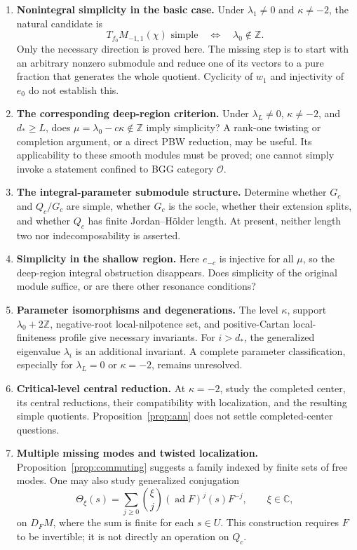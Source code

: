 \documentclass[11pt,a4paper]{article}
\newcommand{\C}{\mathbb C}
\newcommand{\Z}{\mathbb Z}
\newcommand{\ad}{\operatorname{ad}}
\theoremstyle{plainupright}
\begin{document}
\begin{enumerate}[leftmargin=*,label=\arabic*.]
\item \textbf{Nonintegral simplicity in the basic case.}
Under \(\lambda_1\ne0\) and \(\kappa\ne-2\), the natural candidate is
\[
T_{f_0}M_{-1,1}(\chi)\text{ simple}
\quad\Longleftrightarrow\quad \lambda_0\notin\Z.
\]
Only the necessary direction is proved here. The missing step is
to start with an arbitrary nonzero submodule and reduce one of its
vectors to a pure fraction that generates the whole quotient.
Cyclicity of \(w_1\) and injectivity of \(e_0\) do not establish this.

\item \textbf{The corresponding deep-region criterion.}
Under \(\lambda_L\ne0\), \(\kappa\ne-2\), and \(d_*\ge L\),
does \(\mu=\lambda_0-c\kappa\notin\Z\) imply simplicity?
A rank-one twisting or completion argument, or a direct PBW reduction,
may be useful. Its applicability to these smooth modules must be proved;
one cannot simply invoke a statement confined to BGG category
\(\mathcal O\).

\item \textbf{The integral-parameter submodule structure.}
Determine whether \(G_c\) and \(Q_c/G_c\) are simple, whether \(G_c\)
is the socle, whether their extension splits, and whether \(Q_c\)
has finite Jordan--Hölder length. At present, neither length two
nor indecomposability is asserted.

\item \textbf{Simplicity in the shallow region.}
Here \(e_{-c}\) is injective for all \(\mu\), so the deep-region
integral obstruction disappears. Does simplicity of the original
module suffice, or are there other resonance conditions?

\item \textbf{Parameter isomorphisms and degenerations.}
The level \(\kappa\), support \(\lambda_0+2\Z\), negative-root
local-nilpotence set, and positive-Cartan local-finiteness profile
give necessary invariants. For \(i>d_*\), the generalized eigenvalue
\(\lambda_i\) is an additional invariant.
A complete parameter classification, especially for \(\lambda_L=0\)
or \(\kappa=-2\), remains unresolved.

\item \textbf{Critical-level central reduction.}
At \(\kappa=-2\), study the completed center, its central reductions,
their compatibility with localization, and the resulting simple
quotients. Proposition~\ref{prop:ann} does not settle completed-center
questions.

\item \textbf{Multiple missing modes and twisted localization.}
Proposition~\ref{prop:commuting} suggests a family indexed by finite
sets of free modes. One may also study generalized conjugation
\[
\Theta_\xi(s)=\sum_{j\ge0}\binom{\xi}{j}(\ad F)^j(s)F^{-j},
\qquad \xi\in\C,
\]
on \(D_FM\), where the sum is finite for each \(s\in U\).
This construction requires \(F\) to be invertible; it is not
directly an operation on \(Q_c\).
\end{enumerate}
\end{document}
